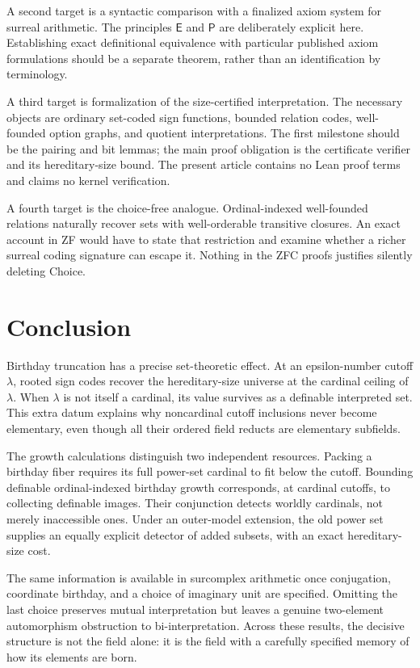 \documentclass[11pt,letterpaper]{article}
\theoremstyle{definition}
\theoremstyle{remark}
\newcommand{\Etern}{\mathsf E}
\newcommand{\Pack}{\mathsf P}
\begin{document}
A second target is a syntactic comparison with a finalized axiom system for
surreal arithmetic. The principles $\Etern$ and $\Pack$ are deliberately
explicit here. Establishing exact definitional equivalence with particular
published axiom formulations should be a separate theorem, rather than an
identification by terminology.

A third target is formalization of the size-certified interpretation. The
necessary objects are ordinary set-coded sign functions, bounded relation
codes, well-founded option graphs, and quotient interpretations. The first
milestone should be the pairing and bit lemmas; the main proof obligation is
the certificate verifier and its hereditary-size bound. The present article
contains no Lean proof terms and claims no kernel verification.

A fourth target is the choice-free analogue. Ordinal-indexed well-founded
relations naturally recover sets with well-orderable transitive closures.
An exact account in ZF would have to state that restriction and examine
whether a richer surreal coding signature can escape it. Nothing in the
ZFC proofs justifies silently deleting Choice.

\section{Conclusion}

Birthday truncation has a precise set-theoretic effect. At an epsilon-number
cutoff $\lambda$, rooted sign codes recover the hereditary-size universe at
the cardinal ceiling of $\lambda$. When $\lambda$ is not itself a cardinal,
its value survives as a definable interpreted set. This extra datum explains
why noncardinal cutoff inclusions never become elementary, even though all
their ordered field reducts are elementary subfields.

The growth calculations distinguish two independent resources. Packing a
birthday fiber requires its full power-set cardinal to fit below the cutoff.
Bounding definable ordinal-indexed birthday growth corresponds, at cardinal
cutoffs, to collecting definable images. Their conjunction detects worldly
cardinals, not merely inaccessible ones. Under an outer-model extension,
the old power set supplies an equally explicit detector of added subsets,
with an exact hereditary-size cost.

The same information is available in surcomplex arithmetic once conjugation,
coordinate birthday, and a choice of imaginary unit are specified. Omitting
the last choice preserves mutual interpretation but leaves a genuine
two-element automorphism obstruction to bi-interpretation. Across these
results, the decisive structure is not the field alone: it is the field
with a carefully specified memory of how its elements are born.
\end{document}
